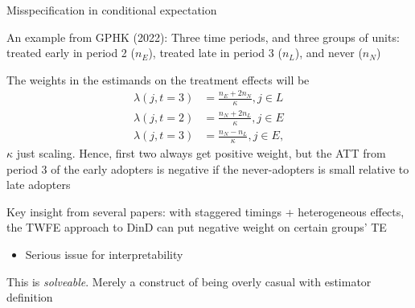 \documentclass[notes,11pt, aspectratio=169]{beamer}
\newenvironment{wideitemize}{\itemize\addtolength{\itemsep}{10pt}}{\enditemize}
\begin{document}
\begin{frame}{Misspecification in conditional expectation}
  \begin{wideitemize}
  \item An example from GPHK (2022): Three time periods, and three
    groups of units: treated early in period 2 ($n_{E}$), treated late in period 3
    ($n_{L}$), and never ($n_{N}$)
  \item The weights in the estimands on the treatment effects will be
    \begin{align}
      \lambda(j,t=3) &= \frac{n_{E} + 2n_{N}}{\kappa}, j \in L\\
      \lambda(j,t=2) &= \frac{n_{N} + 2n_{L}}{\kappa}, j \in E\\
      \lambda(j,t=3) &= \frac{n_{N} - n_{L}}{\kappa}, j \in E,
    \end{align}
    $\kappa$ just scaling. Hence, first two always get positive weight, but the ATT from period 3 of the early adopters is negative if the never-adopters is small relative to late adopters
  \item Key insight from several papers: with staggered timings +
    heterogeneous effects, the TWFE approach to DinD can put negative
    weight on certain groups' TE
  \begin{itemize}
    \item Serious issue for interpretability
    \end{itemize}
  \item This is \emph{solveable}. Merely a construct of being overly
    casual with estimator definition
  \end{wideitemize}
\end{frame}
\end{document}
